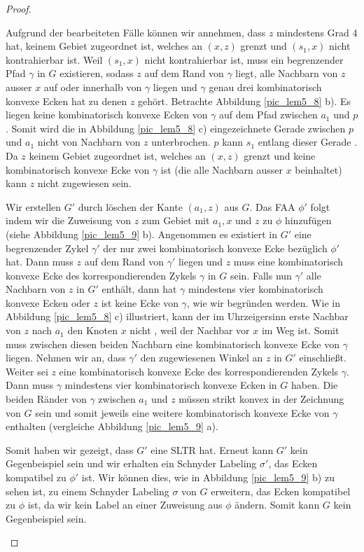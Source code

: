 \begin{proof}
\begin{description}[leftmargin =0pt, font = \bfseries]
\item[Fall 1d] Aufgrund der bearbeiteten Fälle können wir annehmen, dass $z$ mindestens Grad 4 hat, keinem Gebiet zugeordnet ist, welches an $(x,z)$ grenzt und $(s_1,x)$ nicht kontrahierbar ist. Weil $(s_1,x)$ nicht kontrahierbar ist, muss ein begrenzender Pfad $\gamma$ in $G$ existieren, sodass $z$ auf dem Rand von $\gamma$ liegt, alle Nachbarn von $z$ ausser $x$ auf oder innerhalb von $\gamma$ liegen und $\gamma$ genau drei kombinatorisch konvexe Ecken hat zu denen $z$ gehört. Betrachte Abbildung \ref{pic_lem5_8} b). Es liegen keine kombinatorisch konvexe Ecken von $\gamma$ auf dem Pfad zwischen $a_1$ und $p$. Somit wird die in Abbildung \ref{pic_lem5_8} c) eingezeichnete Gerade zwischen $p$ und $a_1$ nicht von Nachbarn von $z$ unterbrochen. $p$ kann $s_1$ entlang dieser Gerade \grqq{ }. Da $z$ keinem Gebiet zugeordnet ist, welches an $(x,z)$ grenzt und keine kombinatorisch konvexe Ecke von $\gamma$ ist (die alle Nachbarn ausser $x$ beinhaltet) kann $z$ nicht zugewiesen sein. 

Wir erstellen $G'$ durch löschen der Kante $(a_1,z)$ aus $G$. Das FAA $\phi'$ folgt indem wir die Zuweisung von $z$ zum Gebiet mit $a_1,x$ und $z$ zu $\phi$ hinzufügen (siehe Abbildung \ref{pic_lem5_9} b). Angenommen es existiert in $G'$ eine begrenzender Zykel $\gamma'$ der nur zwei kombinatorisch konvexe Ecke bezüglich $\phi'$ hat. Dann muss $z$ auf dem Rand von $\gamma'$ liegen und $z$ muss eine kombinatorisch konvexe Ecke des korrespondierenden Zykels $\gamma$ in $G$ sein. Falls nun $\gamma'$ alle Nachbarn von $z$ in $G'$ enthält, dann hat $\gamma$ mindestens vier kombinatorisch konvexe Ecken oder $z$ ist keine Ecke von $\gamma$, wie wir begründen werden. Wie in Abbildung \ref{pic_lem5_8} c) illustriert, kann der im Uhrzeigersinn erste Nachbar von $z$ nach $a_1$ den Knoten $x$ nicht \grqq{ }, weil der Nachbar vor $x$ im Weg ist. Somit muss zwischen diesen beiden Nachbarn eine kombinatorisch konvexe Ecke von $\gamma$ liegen. Nehmen wir an, dass $\gamma'$ den zugewiesenen Winkel an $z$ in $G'$ einschließt. Weiter sei $z$ eine kombinatorisch konvexe Ecke des korrespondierenden Zykels $\gamma$. Dann muss $\gamma$ mindestens vier kombinatorisch konvexe Ecken in $G$ haben. Die beiden Ränder von $\gamma$ zwischen $a_1$ und $z$ müssen strikt konvex in der Zeichnung von $G$ sein und somit jeweils eine weitere kombinatorisch konvexe Ecke von $\gamma$ enthalten (vergleiche Abbildung \ref{pic_lem5_9} a).

Somit haben wir gezeigt, dass $G'$ eine SLTR hat. Erneut kann $G'$ kein Gegenbeispiel sein und wir erhalten ein Schnyder Labeling $\sigma'$, das Ecken kompatibel zu $\phi'$ ist. Wir können dies, wie in Abbildung \ref{pic_lem5_9} b) zu sehen ist, zu einem Schnyder Labeling $\sigma$ von $G$ erweitern, das Ecken kompatibel zu $\phi$ ist, da wir kein Label an einer Zuweisung aus $\phi$ ändern. Somit kann $G$ kein Gegenbeispiel sein.


\end{description}
\end{proof}
